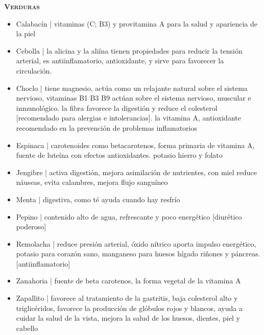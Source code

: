 \textbf{\textsc{Verduras}}

\begin{itemize}
 \item Calabacín | vitaminas (C; B3) y provitamina A %
 para la salud y apariencia de la piel
 \item Cebolla | la alicina y la aliína tienen propiedades para reducir la tensión arterial, es antiinflamatorio, antioxidante, y sirve para favorecer la circulación.
 \item Choclo | tiene magnesio, 
 actúa como un relajante natural sobre el sistema nervioso, 
 vitaminas B1 B3 B9 actúan sobre el sistema nervioso, muscular e inmunológico. 
 la fibra favorece la digestión y reduce el colesterol [recomendado para alergias e intolerancias]. 
 la vitamina A, antioxidante recomendado en la prevención de problemas inflamatorios
 \item Espinaca | carotenoides como betacarotenos, forma primaria de vitamina A, fuente de luteína con efectos antioxidantes. potasio hierro y folato
 \item Jengibre | activa digestión, mejora asimilación de nutrientes, con miel reduce náuseas, evita calambres, mejora flujo sanguíneo
 \item Menta | digestiva, como té ayuda cuando hay resfrío
 \item Pepino | contenido alto de agua, refrescante y poco energético [diurético poderoso]
 \item Remolacha | reduce presión arterial, óxido nítrico aporta impulso energético, potasio para corazón sano, manganeso para huesos hígado riñones y páncreas. [antiinflamatorio]
 \item Zanahoria | fuente de beta carotenos, la forma vegetal de la vitamina A
 \item Zapallito | 
 favorece al tratamiento de la gastritis, %
 baja colesterol alto y triglicéridos, 
 favorece la producción de glóbulos rojos y blancos, 
 ayuda a cuidar la salud de la vista, 
 mejora la salud de los huesos, dientes, piel y cabello


\end{itemize}
